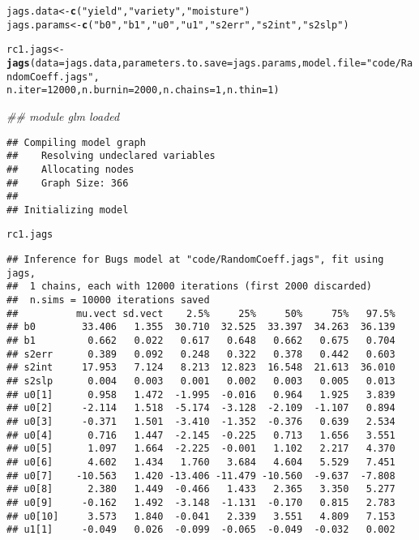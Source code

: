 \documentclass[12pt,letterpaper,oneside]{article}\usepackage{graphicx, color}
\makeatletter
\newcommand{\hlfunctioncall}[1]{\textcolor[rgb]{0.501960784313725,0,0.329411764705882}{\textbf{#1}}}%
\newcommand{\hlstring}[1]{\textcolor[rgb]{0.6,0.6,1}{#1}}%
\newenvironment{kframe}{%
 \def\at@end@of@kframe{}%
 \ifinner\ifhmode%
  \def\at@end@of@kframe{\end{minipage}}%
  \begin{minipage}{\columnwidth}%
 \fi\fi%
 \def\FrameCommand##1{\hskip\@totalleftmargin \hskip-\fboxsep
 \colorbox{shadecolor}{##1}\hskip-\fboxsep
     \hskip-\linewidth \hskip-\@totalleftmargin \hskip\columnwidth}%
 \MakeFramed {\advance\hsize-\width
   \@totalleftmargin\z@ \linewidth\hsize
   \@setminipage}}%
 {\par\unskip\endMakeFramed%
 \at@end@of@kframe}
\newenvironment{knitrout}{}{} %
\makeatother
\begin{document}
\begin{knitrout}\scriptsize
{}\color{fgcolor}\begin{kframe}
\begin{alltt}
jags.data <- \hlfunctioncall{c}(\hlstring{"yield"}, \hlstring{"variety"}, \hlstring{"moisture"})
jags.params <- \hlfunctioncall{c}(\hlstring{"b0"}, \hlstring{"b1"}, \hlstring{"u0"}, \hlstring{"u1"}, \hlstring{"s2err"}, \hlstring{"s2int"}, \hlstring{"s2slp"})

rc1.jags <- \hlfunctioncall{jags}(data = jags.data, parameters.to.save = jags.params, model.file = \hlstring{"code/RandomCoeff.jags"}, 
    n.iter = 12000, n.burnin = 2000, n.chains = 1, n.thin = 1)
\end{alltt}


{\ttfamily\noindent\itshape\textcolor{messagecolor}{\#\# module glm loaded}}\begin{verbatim}
## Compiling model graph
##    Resolving undeclared variables
##    Allocating nodes
##    Graph Size: 366
## 
## Initializing model
\end{verbatim}
\begin{alltt}
rc1.jags
\end{alltt}
\begin{verbatim}
## Inference for Bugs model at "code/RandomCoeff.jags", fit using jags,
##  1 chains, each with 12000 iterations (first 2000 discarded)
##  n.sims = 10000 iterations saved
##          mu.vect sd.vect    2.5%     25%     50%     75%   97.5%
## b0        33.406   1.355  30.710  32.525  33.397  34.263  36.139
## b1         0.662   0.022   0.617   0.648   0.662   0.675   0.704
## s2err      0.389   0.092   0.248   0.322   0.378   0.442   0.603
## s2int     17.953   7.124   8.213  12.823  16.548  21.613  36.010
## s2slp      0.004   0.003   0.001   0.002   0.003   0.005   0.013
## u0[1]      0.958   1.472  -1.995  -0.016   0.964   1.925   3.839
## u0[2]     -2.114   1.518  -5.174  -3.128  -2.109  -1.107   0.894
## u0[3]     -0.371   1.501  -3.410  -1.352  -0.376   0.639   2.534
## u0[4]      0.716   1.447  -2.145  -0.225   0.713   1.656   3.551
## u0[5]      1.097   1.664  -2.225  -0.001   1.102   2.217   4.370
## u0[6]      4.602   1.434   1.760   3.684   4.604   5.529   7.451
## u0[7]    -10.563   1.420 -13.406 -11.479 -10.560  -9.637  -7.808
## u0[8]      2.380   1.449  -0.466   1.433   2.365   3.350   5.277
## u0[9]     -0.162   1.492  -3.148  -1.131  -0.170   0.815   2.783
## u0[10]     3.573   1.840  -0.041   2.339   3.551   4.809   7.153
## u1[1]     -0.049   0.026  -0.099  -0.065  -0.049  -0.032   0.002

\end{verbatim}
\end{kframe}
\end{knitrout}
\end{document}
